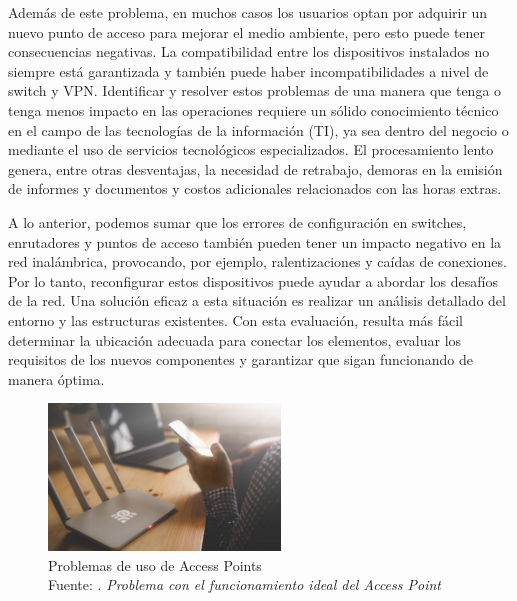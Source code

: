 Además de este problema, en muchos casos los usuarios optan por adquirir un nuevo punto de acceso para mejorar el medio ambiente, pero esto puede tener consecuencias negativas. La compatibilidad entre los dispositivos instalados no siempre está garantizada y también puede haber incompatibilidades a nivel de switch y VPN. Identificar y resolver estos problemas de una manera que tenga o tenga menos impacto en las operaciones requiere un sólido conocimiento técnico en el campo de las tecnologías de la información (TI), ya sea dentro del negocio o mediante el uso de servicios tecnológicos especializados. El procesamiento lento genera, entre otras desventajas, la necesidad de retrabajo, demoras en la emisión de informes y documentos y costos adicionales relacionados con las horas extras.  \cite{ot_napit2017ap}

A lo anterior, podemos sumar que los errores de configuración en switches, enrutadores y puntos de acceso también pueden tener un impacto negativo en la red inalámbrica, provocando, por ejemplo, ralentizaciones y caídas de conexiones. Por lo tanto, reconfigurar estos dispositivos puede ayudar a abordar los desafíos de la red. Una solución eficaz a esta situación es realizar un análisis detallado del entorno y las estructuras existentes. Con esta evaluación, resulta más fácil determinar la ubicación adecuada para conectar los elementos, evaluar los requisitos de los nuevos componentes y garantizar que sigan funcionando de manera óptima.  \cite{ot_napit2017ap}

\begin{figure}[h]
	\begin{center}
		\includegraphics[width=0.55\textwidth]{1/figures/access-point-1.jpeg}
		\caption[Problemas de uso de Access Points]{Problemas de uso de Access Points\\
		Fuente: \cite{ot_napit2017ap}. \textit{Problema con el funcionamiento ideal del Access Point}}
		\label{1:fig2}
	\end{center}
\end{figure}

